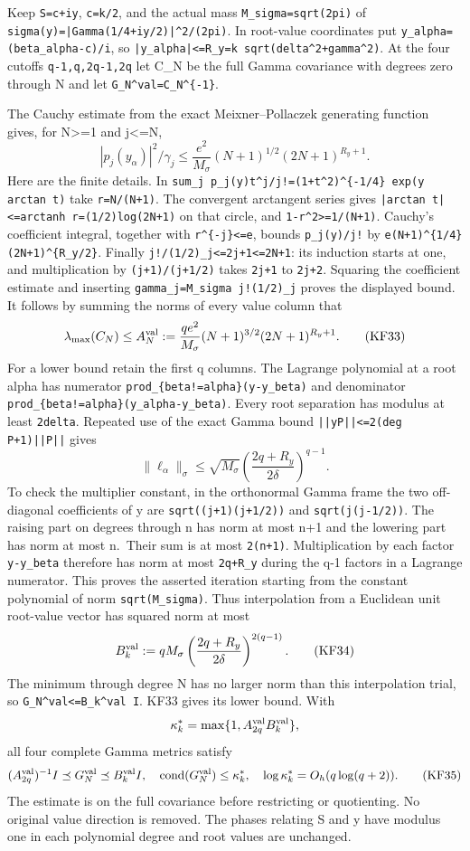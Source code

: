 \documentclass[11pt]{article}
\begin{document}
Keep \texttt{S=c+iy}, \texttt{c=k/2}, and the actual mass \nolinkurl{M_sigma=sqrt(2pi)} of \nolinkurl{sigma(y)=|Gamma(1/4+iy/2)|^2/(2pi)}. In root-value coordinates put \nolinkurl{y_alpha=(beta_alpha-c)/i}, so \nolinkurl{|y_alpha|<=R_y=k sqrt(delta^2+gamma^2)}. At the four cutoffs \texttt{q-1,q,2q-1,2q} let C\_N be the full Gamma covariance with degrees zero through N and let \nolinkurl{G_N^val=C_N^{-1}}.

The Cauchy estimate from the exact Meixner--Pollaczek generating function gives, for N\textgreater=1 and j\textless=N, \[
|p_j(y_\alpha)|^2/\gamma_j
\le\frac{e^2}{M_\sigma}(N+1)^{1/2}(2N+1)^{R_y+1}.
\] Here are the finite details. In \nolinkurl{sum_j p_j(y)t^j/j!=(1+t^2)^{-1/4} exp(y arctan t)} take \texttt{r=N/(N+1)}. The convergent arctangent series gives \nolinkurl{|arctan t|<=arctanh r=(1/2)log(2N+1)} on that circle, and \texttt{1-r\^{}2\textgreater{}=1/(N+1)}. Cauchy's coefficient integral, together with \texttt{r\^{}\{-j\}\textless{}=e}, bounds \texttt{\textbar{}p\_j(y)\textbar{}/j!} by \nolinkurl{e(N+1)^{1/4}(2N+1)^{R_y/2}}. Finally \nolinkurl{j!/(1/2)_j<=2j+1<=2N+1}: its induction starts at one, and multiplication by \texttt{(j+1)/(j+1/2)} takes \texttt{2j+1} to \texttt{2j+2}. Squaring the coefficient estimate and inserting \nolinkurl{gamma_j=M_sigma j!(1/2)_j} proves the displayed bound. It follows by summing the norms of every value column that \[
\lambda_{\max}(C_N)\le
A_N^{\rm val}:=\frac{qe^2}{M_\sigma}(N+1)^{3/2}
 (2N+1)^{R_y+1}.
\tag{KF33}
\] For a lower bound retain the first q columns. The Lagrange polynomial at a root alpha has numerator \nolinkurl{prod_{beta!=alpha}(y-y_beta)} and denominator \nolinkurl{prod_{beta!=alpha}(y_alpha-y_beta)}. Every root separation has modulus at least \texttt{2delta}. Repeated use of the exact Gamma bound \nolinkurl{||yP||<=2(deg P+1)||P||} gives \[
\|\ell_\alpha\|_\sigma
\le\sqrt{M_\sigma}
\left(\frac{2q+R_y}{2\delta}\right)^{q-1}.
\] To check the multiplier constant, in the orthonormal Gamma frame the two off-diagonal coefficients of y are \nolinkurl{sqrt((j+1)(j+1/2))} and \texttt{sqrt(j(j-1/2))}. The raising part on degrees through n has norm at most n+1 and the lowering part has norm at most n.~Their sum is at most \texttt{2(n+1)}. Multiplication by each factor \texttt{y-y\_beta} therefore has norm at most \texttt{2q+R\_y} during the q-1 factors in a Lagrange numerator. This proves the asserted iteration starting from the constant polynomial of norm \texttt{sqrt(M\_sigma)}. Thus interpolation from a Euclidean unit root-value vector has squared norm at most \[
B_k^{\rm val}:=qM_\sigma
 \left(\frac{2q+R_y}{2\delta}\right)^{2(q-1)}.
\tag{KF34}
\] The minimum through degree N has no larger norm than this interpolation trial, so \nolinkurl{G_N^val<=B_k^val I}. KF33 gives its lower bound. With \[
\kappa_k^*=\max\{1,A_{2q}^{\rm val}B_k^{\rm val}\},
\] all four complete Gamma metrics satisfy \[
(A_{2q}^{\rm val})^{-1}I\preceq G_N^{\rm val}
\preceq B_k^{\rm val}I,
\quad \operatorname{cond}(G_N^{\rm val})\le\kappa_k^*,
\quad\log\kappa_k^*=O_h(q\log(q+2)).
\tag{KF35}
\] The estimate is on the full covariance before restricting or quotienting. No original value direction is removed. The phases relating S and y have modulus one in each polynomial degree and root values are unchanged.
\end{document}
